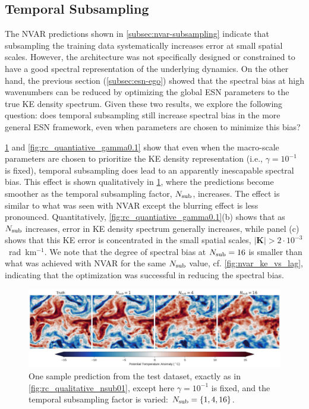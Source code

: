 \subsection{Temporal Subsampling}
\label{subsec:esn-subsampling}


The NVAR predictions shown in \cref{subsec:nvar-subsampling} indicate that
subsampling the training data systematically increases error at small spatial
scales.
However, the architecture was not specifically designed or constrained to
have a good spectral representation of the underlying dynamics.
On the other hand, the previous section (\cref{subsec:esn-ego})
showed that the spectral bias at high wavenumbers
can be reduced by optimizing the global ESN parameters
to the true KE density spectrum.
Given these two results, we explore the following question: does temporal subsampling still
increase spectral bias in the more general ESN framework, even when parameters
are chosen to minimize this bias?

\cref{fig:rc_qualitative_gamma0.1} and \cref{fig:rc_quantiative_gamma0.1}
show that even when the macro-scale parameters are chosen to prioritize the KE
density representation (i.e., $\gamma = 10^{-1}$ is fixed),
temporal subsampling does lead to an apparently inescapable spectral bias.
This effect is shown qualitatively in \cref{fig:rc_qualitative_gamma0.1},
where the predictions become
smoother as the temporal subsampling factor, $N_\text{sub}$, increases.
The effect is similar to what was seen with NVAR except the blurring effect is
less pronounced.
Quantitatively, \cref{fig:rc_quantiative_gamma0.1}(b) shows that as $N_\text{sub}$
increases, error in KE density spectrum generally increases, while panel (c) shows that this KE
error is concentrated in the small spatial scales,
$|\mathbf{K}| > 2\cdot10^{-3}$~rad~km$^{-1}$.
We note that the degree of spectral bias at $N_\text{sub}=16$ is smaller than what was
achieved with NVAR for the same $N_\text{sub}$ value, cf. \cref{fig:nvar_ke_vs_lag},
indicating that the optimization was successful in reducing the spectral bias.

\begin{figure}
    \centering
    \includegraphics[width=\textwidth]{../figures/rc_qualitative_nsub.jpg}
    \caption{One sample prediction from the test dataset, exactly as in
        \cref{fig:rc_qualitative_nsub01}, except here $\gamma=10^{-1}$ is fixed, and
        the temporal subsampling factor is varied: $N_\text{sub}=\{1,4,16\}$.
    }
    \label{fig:rc_qualitative_gamma0.1}
\end{figure}

